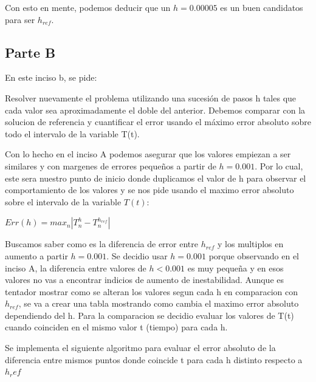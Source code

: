 Con esto en mente, podemos deducir que un $h = 0.00005$ es un buen candidatos para ser $h_{ref}$.

\subsection{Parte B}

En este inciso b, se pide:

Resolver nuevamente el problema utilizando una sucesión de pasos h tales que cada valor sea 
aproximadamente el doble del anterior. Debemos comparar con la solucion de referencia y cuantificar el error usando el máximo error absoluto sobre todo el intervalo de la variable 
T(t). 

Con lo hecho en el inciso A podemos asegurar que los valores empiezan a ser similares y con margenes de errores pequeños a partir de $h = 0.001$. Por lo cual, este sera nuestro punto de inicio donde duplicamos el valor de h para observar el comportamiento de los valores y se nos pide usando el maximo error absoluto sobre el intervalo de la variable $T(t)$:

$Err(h) = max_{n} |T_{n}^{h} - T_{n}^{h_{ref}}|$

Buscamos saber como es la diferencia de error entre $h_{ref}$ y los multiplos en aumento a partir $h = 0.001$. Se decidio usar $h = 0.001$ porque observando en el inciso A, la diferencia entre valores de $h < 0.001$ es muy pequeña y en esos valores no vas a encontrar indicios de aumento de inestabilidad. Aunque es tentador mostrar como se alteran los valores segun cada h en comparacion con $h_{ref}$, se va a crear una tabla mostrando como cambia el maximo error absoluto dependiendo del h. Para la comparacion se decidio evaluar los valores de T(t) cuando coinciden en el mismo valor t (tiempo) para cada h.

Se implementa el siguiente algoritmo para evaluar el error absoluto de la diferencia entre mismos puntos donde coincide t para cada h distinto respecto a ${h_ref}$

